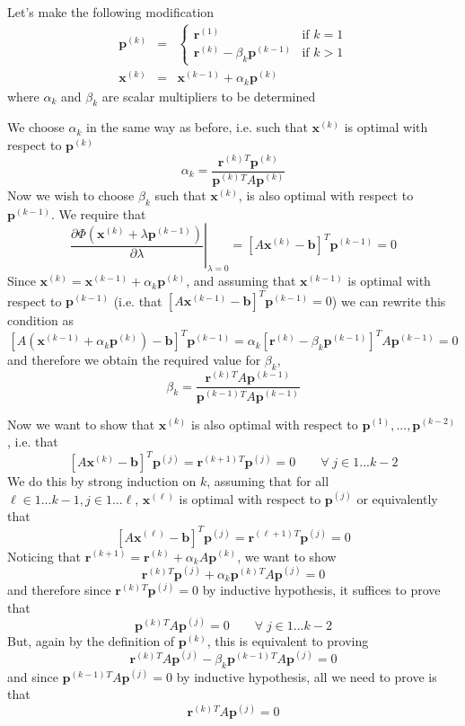 \documentclass[12pt]{article}
\def\v#1{\mathbf{#1}}
\def\T{^{T}}
\def\con#1{^{(#1)}}
\def\eqn#1#2{\begin{equation} \label{#1} #2 \end{equation}}
\def\eqna#1#2{\begin{eqnarray} \label{#1} #2 \end{eqnarray}}
\begin{document}
Let's make the following modification
\eqna{}{
\v p\con k &=&
\begin{cases}
\v r \con 1 & \text{if } k = 1 \\
\v r \con k - \beta_k \v p \con {k-1} & \text{if } k > 1
\end{cases} \\
\v x\con k &=& \v x\con {k-1} + \alpha_k \v p \con k
}
where $\alpha_k$ and $\beta_k$ are scalar multipliers to be determined

We choose $\alpha_k$ in the same way as before, i.e. such that $\v x\con k$ is optimal with respect to $\v p \con k$
\eqn{}{\alpha_k = \frac{\v r\con k{}\T\v p \con k}{\v p \con k{}\T A \v p \con k}}
Now we wish to choose $\beta_k$ such that $\v x\con k$, is also optimal with respect to $\v p \con{k-1}$. We require that
\eqn{}{\left.\frac{\partial \Phi(\v x\con k + \lambda \v p\con {k-1})}{\partial \lambda}\right|_{\lambda = 0} = [A\v x\con k - \v b]\T \v p\con{k-1} = 0}
Since $\v x\con k = \v x \con{k-1} + \alpha_k \v p \con k$, and assuming that $\v x\con{k-1}$ is optimal with respect to $\v p\con {k-1}$ (i.e. that $[A\v x\con {k-1} - \v b]\T \v p\con{k-1} = 0$) we can rewrite this condition as
\eqn{}{[A(\v x\con{k-1} + \alpha_k \v p\con k) - \v b]\T \v p\con{k-1} = \alpha_k [\v r\con k - \beta_k\v p \con{k-1}]\T A \v p\con{k-1} = 0}
and therefore we obtain the required value for $\beta_k$,
\eqn{}{\beta_k = \frac{\v r\con k{}\T A \v p\con{k-1}}{\v p\con{k-1}{}\T A \v p\con{k-1}}}

Now we want to show that $\v x\con k$ is also optimal with respect to $\v p\con 1, ..., \v p\con{k-2}$, i.e. that
\eqn{}{[A\v x\con k - \v b]\T\v p\con j = \v r \con{k+1}{}\T \v p \con j = 0 \qquad \forall\; j \in 1...k-2}
We do this by strong induction on $k$, assuming that for all $\ell \in 1 ... k-1, j \in 1 ... \ell$, $\v x \con \ell$ is optimal with respect to $\v p\con j$ or equivalently that
\eqn{orto}{[A\v x\con \ell - \v b]\T\v p \con j = \v r\con{\ell+1}{}\T \v p \con j = 0}
Noticing that $\v r \con{k+1} = \v r \con k + \alpha_k A \v p \con k$, we want to show
\eqn{}{\v r \con k {}\T \v p \con j + \alpha_k \v p \con k {}\T A \v p \con j = 0}
and therefore since $\v r \con k {}\T \v p \con j = 0$ by inductive hypothesis, it suffices to prove that
\eqn{}{\v p \con k{}\T A \v p \con j = 0 \qquad \forall \; j \in 1...k-2}
But, again by the definition of $\v p \con k$, this is equivalent to proving
\eqn{}{\v r \con k {}\T A \v p \con j - \beta_k \v p \con{k-1} {}\T A \v p \con j = 0}
and since $\v p \con{k-1} {}\T A \v p \con j = 0$ by inductive hypothesis, all we need to prove is that 
\eqn{}{\v r \con k {}\T A \v p \con j = 0}
\end{document}
